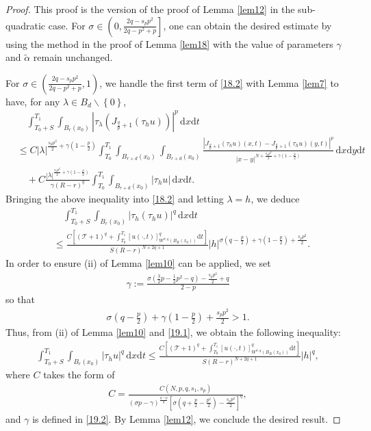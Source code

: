 \documentclass[reqno,10pt]{amsart}
\numberwithin{equation}{section}
\begin{document}
\begin{proof}
	This proof is the version of the proof of Lemma \ref{lem12} in the sub-quadratic case. For $\sigma\in \left(0,\frac{2q-s_pp^2}{2q-p^2+p}\right]$, one can obtain the desired estimate by using the method in the proof of Lemma \ref{lem18} with the value of parameters $\gamma$ and $\tilde{\alpha}$ remain unchanged.
	
	For $\sigma\in\left(\frac{2q-s_pp^2}{2q-p^2+p},1\right)$, we handle the first term of \eqref{18.2} with Lemma \ref{lem7} to have, for any $\lambda\in B_d\backslash\left\lbrace0\right\rbrace$,
	\begin{align*}
		&\quad\int_{T_0+S}^{T_1}\int_{B_r(x_0)}\left|\tau_\lambda\left( J_{\frac{q}{p}+1}(\tau_hu)\right) \right|^p\,\mathrm{d}x\mathrm{d}t\\
		&\le C|\lambda|^{\frac{s_pp^2}{2}+\gamma\left( 1-\frac{p}{2}\right) } \int_{T_0}^{T_1}\int_{B_{r+d}(x_0)}\int_{B_{r+d}(x_0)}\frac{\left|J_{\frac{q}{p}+1}(\tau_hu)(x,t)-J_{\frac{q}{p}+1}(\tau_hu)(y,t)\right|^p}{|x-y|^{N+\frac{s_pp^2}{2}+\gamma\left(1-\frac{p}{2}\right)}}\,\mathrm{d}x\mathrm{d}y\mathrm{d}t\\
		&\quad+C\frac{|\lambda|^{\frac{s_pp^2}{2}+\gamma\left( 1-\frac{p}{2}\right) }}{\gamma(R-r)^{q}}\int_{T_0}^{T_1}\int_{B_{r+d}(x_0)}|\tau_hu|\,\mathrm{d}x\mathrm{d}t.
	\end{align*}
	Bringing the above inequality into \eqref{18.2} and letting $\lambda=h$, we deduce
	\begin{align}
		\label{19.1}
		&\quad\int_{T_0+S}^{T_1}\int_{B_r(x_0)}\left|\tau_h(\tau_hu)\right|^q\,\mathrm{d}x\mathrm{d}t\nonumber\\
		&\le\frac{C\left[\left(\mathcal{T}+1\right)^q+\int_{T_0}^{T_1}[u(\cdot,t)]^q_{W^{\sigma,q}\left( B_R(x_0)\right)}\mathrm{d}t\right]}{S(R-r)^{N+2q+1}}|h|^{\sigma\left(q-\frac{p}{2}\right)+\gamma\left(1-\frac{p}{2}\right)+\frac{s_pp^2}{2}}.
	\end{align}
	In order to ensure (ii) of Lemma \ref{lem10} can be applied, we set
	\begin{align}
		\label{19.2}
		\gamma:=\frac{\sigma\left(\frac{3}{2}p-\frac{1}{2}p^2-q\right)-\frac{s_pp^2}{2}+q}{2-p}
	\end{align}
	so that
	\begin{align*}
		\sigma\left(q-\frac{p}{2}\right)+\gamma\left(1-\frac{p}{2}\right)+\frac{s_pp^2}{2}>1.
	\end{align*}
	Thus, from (ii) of Lemma \ref{lem10} and  \eqref{19.1}, we obtain the following inequality:
	\begin{align*}
		\int_{T_0+S}^{T_1}\int_{B_r(x_0)}|\tau_hu|^q\,\mathrm{d}x\mathrm{d}t\le \frac{C\left[\left(\mathcal{T}+1\right)^q+\int_{T_0}^{T_1}[u(\cdot,t)]^q_{W^{\sigma,q}\left( B_R(x_0)\right)}\mathrm{d}t\right]}{S(R-r)^{N+2q+1}}|h|^q,
	\end{align*}
	where $C$ takes the form of
	\begin{align*}
		C=\frac{C(N,p,q,s_1,s_p)}{(\sigma p-\gamma)^\frac{q-p}{q}\left[\sigma\left(q+\frac{p}{2}-\frac{p^2}{2}\right)-\frac{s_pp^2}{2}\right]^q},
	\end{align*}
	and $\gamma$ is defined in \eqref{19.2}. By Lemma \ref{lem12}, we conclude the desired result.
\end{proof}
\end{document}
